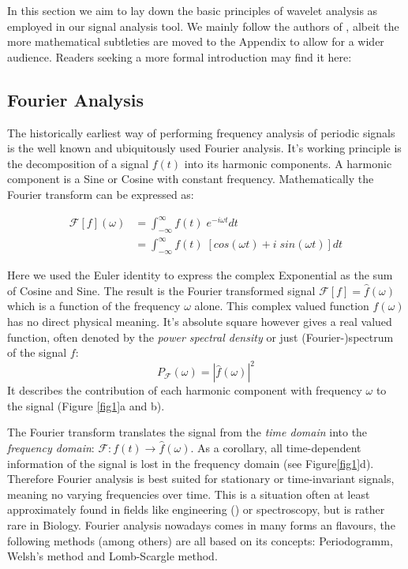 
In this section we aim to lay down the basic principles of wavelet analysis as employed in our signal analysis tool. We mainly follow the authors of \cite{Torrence1998}, albeit the more mathematical subtleties are moved to the Appendix to allow for a wider audience. Readers seeking a more formal introduction may find it here: \cite{Daubechies1992, Mallat1999} 

\subsection*{Fourier Analysis}


The historically earliest way of performing frequency analysis of periodic signals is the well known and ubiquitously used Fourier analysis. It's working principle is the decomposition of a signal $f(t)$ into its harmonic components. A harmonic component is a Sine or Cosine with constant frequency. Mathematically the Fourier transform can be expressed as:

\begin{align}
  \label{Ftrafo}
  \mathcal{F}[f](\omega) &= \int_{-\infty}^{\infty} f(t)\;e^{- i \omega t} dt \\
  &= \int_{-\infty}^{\infty} f(t)\; \left[cos(\omega t) + i\;sin(\omega t) \right] dt
\end{align}

Here we used the Euler identity to express the complex Exponential as the sum of Cosine and Sine. The result is the Fourier transformed signal $\mathcal{F}[f] = \widehat{f}(\omega)$ which is a function of the frequency $\omega$ alone. 
This complex valued function $\widehat{f}(\omega)$ has no direct physical meaning. It's absolute square however gives a real valued function, often denoted by the \textit{power spectral density} or just (Fourier-)spectrum of the signal $f$:
\begin{equation}
  P_\mathcal{F}(\omega) = |\widehat{f}(\omega)|^2
\end{equation}
It describes the contribution of each harmonic component with frequency $\omega$ to the signal (Figure \ref{fig1}a and b). 

The Fourier transform translates the signal from the \textit{time domain} into the \textit{frequency domain}: $\mathcal{F} : f(t) \rightarrow \widehat{f}(\omega)$. As a corollary, all time-dependent information of the signal is lost in the frequency domain (see Figure\ref {fig1}d). Therefore Fourier analysis is best suited for stationary or time-invariant signals, meaning no varying frequencies over time. This is a situation often at least approximately found in fields like engineering (\cite{Smith1997}) or spectroscopy, but is rather rare in Biology. Fourier analysis nowadays comes in many forms an flavours, the following methods (among others) are all based on its concepts: Periodogramm, Welsh's method and Lomb-Scargle method.

